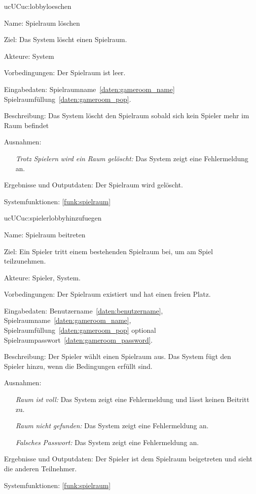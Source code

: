 \begin{description}[leftmargin=5em, style=sameline]
    \begin{lhp}{uc}{UC}{uc:lobbyloeschen}
    \item [Name:] Spielraum löschen
    \item [Ziel:] Das System löscht einen Spielraum.
    \item [Akteure:] System
    \item [Vorbedingungen:] Der Spielraum ist leer.
    \item [Eingabedaten:] Spielraumname~\ref{daten:gameroom_name} Spielraumfüllung~\ref{daten:gameroom_pop}.
    \item [Beschreibung:] Das System löscht den Spielraum sobald sich kein Spieler mehr im Raum befindet
    \item [Ausnahmen:] \hfill
        \begin{itemize}
            \item[] \textit{Trotz Spielern wird ein Raum gelöscht:} Das System zeigt eine Fehlermeldung an.
        \end{itemize}
    \item [Ergebnisse und Outputdaten:] Der Spielraum wird gelöscht.
    \item [Systemfunktionen:] \ref{funk:spielraum}
    \end{lhp}
    
    \begin{lhp}{uc}{UC}{uc:spielerlobbyhinzufuegen}
    \item [Name:] Spielraum beitreten
    \item [Ziel:] Ein Spieler tritt einem bestehenden Spielraum bei, um am Spiel teilzunehmen.
    \item [Akteure:] Spieler, System.
    \item [Vorbedingungen:] Der Spielraum existiert und hat einen freien Platz.
    \item [Eingabedaten:] Benutzername~\ref{daten:benutzername}, Spielraumname~\ref{daten:gameroom_name}, Spielraumfüllung~\ref{daten:gameroom_pop} optional Spielraumpasswort~\ref{daten:gameroom_password}.
    \item [Beschreibung:] Der Spieler wählt einen Spielraum aus. Das System fügt den Spieler hinzu, wenn die Bedingungen erfüllt sind.
    \item [Ausnahmen:] \hfill
        \begin{itemize}
            \item[] \textit{Raum ist voll:} Das System zeigt eine Fehlermeldung und lässt keinen Beitritt zu.
            \item[] \textit{Raum nicht gefunden:} Das System zeigt eine Fehlermeldung an.
            \item[] \textit{Falsches Passwort:} Das System zeigt eine Fehlermeldung an.
        \end{itemize}
    \item [Ergebnisse und Outputdaten:] Der Spieler ist dem Spielraum beigetreten und sieht die anderen Teilnehmer.
    \item [Systemfunktionen:] \ref{funk:spielraum}
    \end{lhp}


\end{description}
